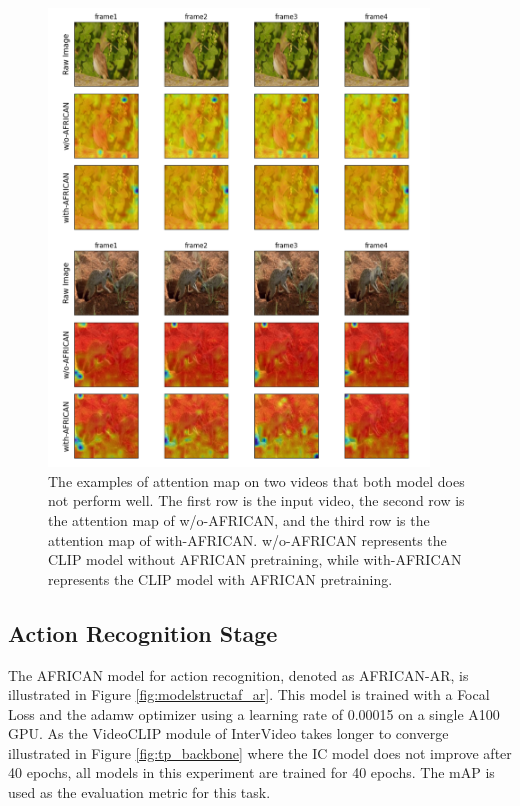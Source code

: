 \begin{figure}[ht]
    \centering
    \includegraphics[width=0.9\textwidth]{assets/charts/4_5_AttentionMaps_4}
    \caption[Attention Map 4 (Bad examples)]{The examples of attention map on two videos that both model does not perform well. The first row is the input video, the second row is the attention map of w/o-AFRICAN, and the third row is the attention map of with-AFRICAN. w/o-AFRICAN represents the CLIP model without AFRICAN pretraining, while with-AFRICAN represents the CLIP model with AFRICAN pretraining.}
    \label{fig:attnmap4}
\end{figure}




\subsection{Action Recognition Stage}
The AFRICAN model for action recognition, denoted as AFRICAN-AR, is illustrated in Figure \ref{fig:modelstructaf_ar}. This model is trained with a Focal Loss and the adamw optimizer using a learning rate of 0.00015 on a single A100 GPU. As the VideoCLIP module of InterVideo takes longer to converge illustrated in Figure \ref{fig:tp_backbone} where the IC model does not improve after 40 epochs, all models in this experiment are trained for 40 epochs. The mAP is used as the evaluation metric for this task.

